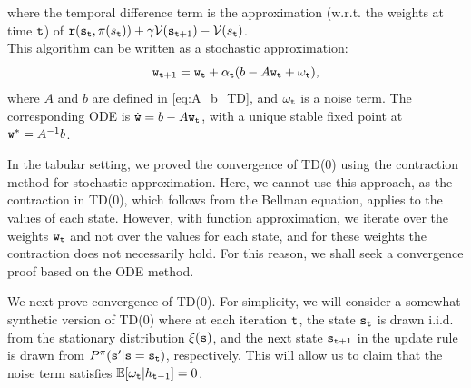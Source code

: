 \begin{enumerate}
where the temporal difference term is the approximation (w.r.t. the weights at time ${\tt t}$) of ${\tt r}({\tt s}_{\tt t},\pi(s_{\tt t})) +\gamma \mathcal{V}({\tt s}_{{\tt t}+1}) - \mathcal{V}(s_{\tt t})$.
\\
This algorithm can be written as a stochastic approximation:
\begin{equation*}
    {\tt w}_{{\tt t}+1} = {\tt w}_{\tt t} + \alpha_{\tt t} ( b -  A {\tt w}_{\tt t} + \omega_{\tt t} ),
\end{equation*}
where $A$ and $b$ are defined in \eqref{eq:A_b_TD}, and $\omega_{\tt t}$ is a noise term. The corresponding ODE is $\dot{{\tt w}} = b -  A {\tt w}_{\tt t}$, with a unique stable fixed point at ${\tt w}^* = A^{-1}b$. 

\begin{remark}
    In the tabular setting, we proved the convergence of TD(0) using the contraction method for stochastic approximation. Here, we cannot use this approach, as the contraction in TD(0), which follows from the Bellman equation, applies to the values of each state. However, with function approximation, we iterate over the weights ${\tt w}_{\tt t}$ and not over the values for each state, and for these weights the contraction does not necessarily hold. For this reason, we shall seek a convergence proof based on the ODE method.
\end{remark}

We next prove convergence of TD(0). For simplicity, we will consider a somewhat synthetic version of TD(0) where at each iteration ${\tt t}$, the state ${\tt s}_{\tt t}$ is drawn i.i.d. from the stationary distribution $\xi({\tt s})$, and the next state ${\tt s}_{{\tt t}+1}$ in the update rule is drawn from $P^\pi({\tt s}'|{\tt s} = {\tt s}_{\tt t})$, respectively. This will allow us to claim that the noise term satisfies $\mathbb{E}[\omega_{\tt t}|h_{{\tt t}-1}]=0$. 



\end{enumerate}
